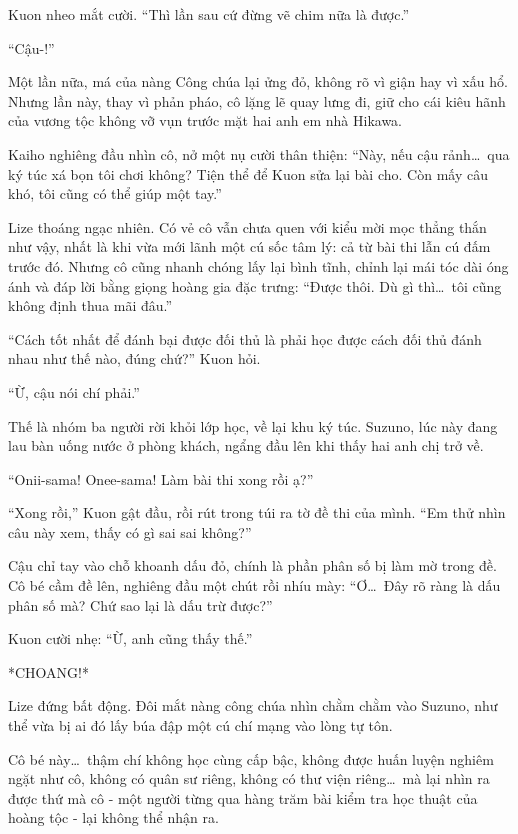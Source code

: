 \documentclass[../main.tex]{subfiles}
\begin{document}
Kuon nheo mắt cười. ``Thì lần sau cứ đừng vẽ chim nữa là được.''

``Cậu-!''

Một lần nữa, má của nàng Công chúa lại ửng đỏ, không rõ vì giận hay vì xấu hổ. Nhưng lần này, thay vì phản pháo, cô lặng lẽ quay lưng đi, giữ cho cái kiêu hãnh của vương tộc không vỡ vụn trước mặt hai anh em nhà Hikawa.

Kaiho nghiêng đầu nhìn cô, nở một nụ cười thân thiện: ``Này, nếu cậu rảnh\dots\ qua ký túc xá bọn tôi chơi không? Tiện thể để Kuon sửa lại bài cho. Còn mấy câu khó, tôi cũng có thể giúp một tay.''

Lize thoáng ngạc nhiên. Có vẻ cô vẫn chưa quen với kiểu mời mọc thẳng thắn như vậy, nhất là khi vừa mới lãnh một cú sốc tâm lý: cả từ bài thi lẫn cú đấm trước đó. Nhưng cô cũng nhanh chóng lấy lại bình tĩnh, chỉnh lại mái tóc dài óng ánh và đáp lời bằng giọng hoàng gia đặc trưng:
``Được thôi. Dù gì thì\dots\ tôi cũng không định thua mãi đâu.''

``Cách tốt nhất để đánh bại được đối thủ là phải học được cách đối thủ đánh nhau như thế nào, đúng chứ?'' Kuon hỏi.

``Ừ, cậu nói chí phải.''

\ct

Thế là nhóm ba người rời khỏi lớp học, về lại khu ký túc. Suzuno, lúc này đang lau bàn uống nước ở phòng khách, ngẩng đầu lên khi thấy hai anh chị trở về.

``Onii-sama! Onee-sama! Làm bài thi xong rồi ạ?''

``Xong rồi,'' Kuon gật đầu, rồi rút trong túi ra tờ đề thi của mình. ``Em thử nhìn câu này xem, thấy có gì sai sai không?''

Cậu chỉ tay vào chỗ khoanh dấu đỏ, chính là phần phân số bị làm mờ trong đề. Cô bé cầm đề lên, nghiêng đầu một chút rồi nhíu mày: ``Ơ\dots\ Đây rõ ràng là dấu phân số mà? Chứ sao lại là dấu trừ được?''

Kuon cười nhẹ: ``Ừ, anh cũng thấy thế.''

*CHOANG!*

Lize đứng bất động. Đôi mắt nàng công chúa nhìn chằm chằm vào Suzuno, như thể vừa bị ai đó lấy búa đập một cú chí mạng vào lòng tự tôn.

Cô bé này\dots\ thậm chí không học cùng cấp bậc, không được huấn luyện nghiêm ngặt như cô, không có quân sư riêng, không có thư viện riêng\dots\ mà lại nhìn ra được thứ mà cô - một người từng qua hàng trăm bài kiểm tra học thuật của hoàng tộc - lại không thể nhận ra.
\end{document}
